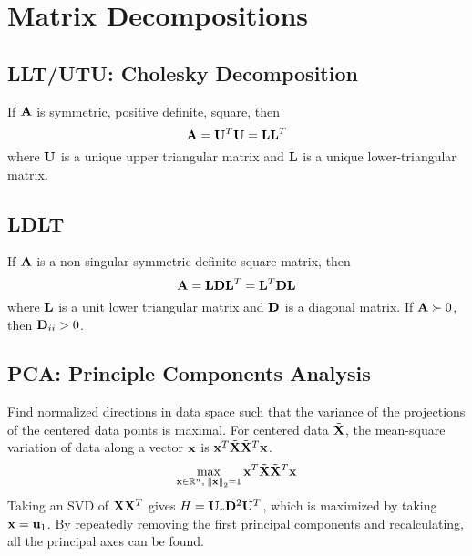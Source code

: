 \chapter{Matrix Decompositions}

\section{LLT/UTU: Cholesky Decomposition} %
If $\mathbf{A}$ is symmetric, positive definite, square, then
\begin{equation}
\mathbf{A}=\mathbf{U}^T\mathbf{U}=\mathbf{L}\mathbf{L}^T
\end{equation}
where $\mathbf{U}$ is a unique upper triangular matrix and $\mathbf{L}$ is a unique lower-triangular matrix.

\section{LDLT}

If $\mathbf{A}$ is a non-singular symmetric definite square matrix, then
\begin{equation}
\mathbf{A}=\mathbf{L}\mathbf{D}\mathbf{L}^T=\mathbf{L}^T\mathbf{D}\mathbf{L}
\end{equation}
where $\mathbf{L}$ is a unit lower triangular matrix and $\mathbf{D}$ is a diagonal matrix. If $\mathbf{A}\succ0$, then $\mathbf{D}_{ii}>0$.




\section{PCA: Principle Components Analysis}
Find normalized directions in data space such that the variance of the projections of the centered data points is maximal. For centered data $\tilde {\mathbf{X}}$, the mean-square variation of data along a vector $\mathbf{x}$ is $\mathbf{x}^T \tilde {\mathbf{X}} \tilde {\mathbf{X}}^T \mathbf{x}$.
\begin{equation}
\max_{\mathbf{x}\in\mathbb{R}^{n},~\norm{\mathbf{x}}_2=1} \mathbf{x}^T \tilde {\mathbf{X}} \tilde {\mathbf{X}}^T \mathbf{x}
\end{equation}
Taking an SVD of $\tilde {\mathbf{X}} \tilde {\mathbf{X}}^T$ gives $H=\mathbf{U}_r\mathbf{D}^2\mathbf{U}^T$, which is maximized by taking $\mathbf{x}=\mathbf{u}_1$. By repeatedly removing the first principal components and recalculating, all the principal axes can be found.




